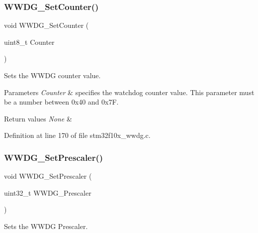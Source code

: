\subsubsection{\texorpdfstring{W\+W\+D\+G\+\_\+\+Set\+Counter()}{WWDG\_SetCounter()}}
{\footnotesize\ttfamily void W\+W\+D\+G\+\_\+\+Set\+Counter (\begin{DoxyParamCaption}\item[{uint8\+\_\+t}]{Counter }\end{DoxyParamCaption})}



Sets the W\+W\+DG counter value. 


\begin{DoxyParams}{Parameters}
{\em Counter} & specifies the watchdog counter value. This parameter must be a number between 0x40 and 0x7F. \\
\hline
\end{DoxyParams}

\begin{DoxyRetVals}{Return values}
{\em None} & \\
\hline
\end{DoxyRetVals}


Definition at line 170 of file stm32f10x\+\_\+wwdg.\+c.

\mbox{\label{group___w_w_d_g___private___functions_gafeaa2b52c31ba7baca7eb61d2d42e07b}} 
\subsubsection{\texorpdfstring{W\+W\+D\+G\+\_\+\+Set\+Prescaler()}{WWDG\_SetPrescaler()}}
{\footnotesize\ttfamily void W\+W\+D\+G\+\_\+\+Set\+Prescaler (\begin{DoxyParamCaption}\item[{uint32\+\_\+t}]{W\+W\+D\+G\+\_\+\+Prescaler }\end{DoxyParamCaption})}



Sets the W\+W\+DG Prescaler. 


